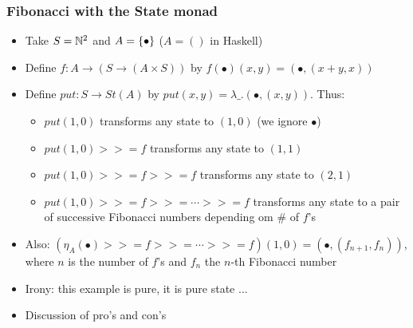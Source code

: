 \documentclass[handout]{beamer}
\newcommand{\bind}{{>}\!\!{>}\!{=}}
\begin{document}
\frame
  {   
    \frametitle{Fibonacci with the State monad}\label{Mon5:FibState}

 \begin{itemize}[<+->]
\item Take $S=\mathbb{N}^2$ and $A=\{\bullet\}$ ($A=()$ in Haskell) 
\item Define $f: A\to (S\to (A\times S))$ by $f(\bullet)(x,y) = (\bullet,(x+y,x))$
\item Define $put: S\to St(A)$ by $put(x,y) = \lambda\_.(\bullet,(x,y))$. Thus:
 \begin{itemize}
    \item $put(1,0)$ transforms any state to $(1,0)$ (we ignore $\bullet$)
    \item $put(1,0) \bind f$ transforms any state to $(1,1)$
    \item $put(1,0) \bind f \bind f$ transforms any state to $(2,1)$
    \item $put(1,0) \bind f \bind \cdots \bind f$  transforms any state to
a pair of successive Fibonacci numbers depending om \# of $f$'s
 \end{itemize}
\item Also: $(\eta_A(\bullet) \bind f \bind \cdots \bind f)(1,0) = (\bullet,(f_{n+1},f_n))$,
where $n$ is the number of $f$'s and $f_n$ the $n$-th Fibonacci number
\item Irony: this example is pure, it is pure state ...
\item Discussion of pro's and con's
 \end{itemize}
 }
\end{document}
